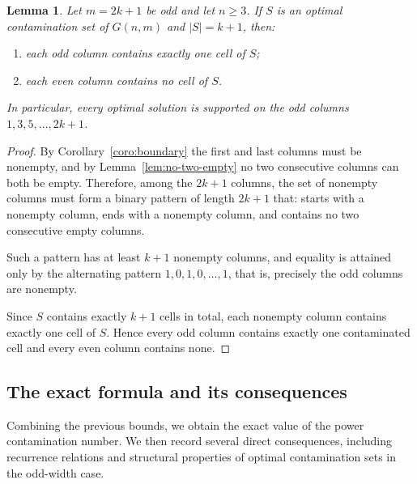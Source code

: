 \documentclass[letterpaper,12pt]{article}
\newtheorem{lemma}{Lemma}
\begin{document}
\begin{lemma}\label{lem:canonical-odd-columns}
Let $m=2k+1$ be odd and let $n\ge 3$. If $S$ is an optimal contamination set of $G(n,m)$ and $|S|=k+1$, then:
\begin{enumerate}
    \item each odd column contains exactly one cell of $S$;
    \item each even column contains no cell of $S$.
\end{enumerate}
In particular, every optimal solution is supported on the odd columns
$1,3,5,\dots,2k+1$.
\end{lemma}

\begin{proof}
By Corollary~\ref{coro:boundary} the first and last columns must be nonempty, and by Lemma~\ref{lem:no-two-empty} no two consecutive columns can both be empty. Therefore, among the $2k+1$ columns, the set of nonempty columns must form a binary pattern of length $2k+1$ that: starts with a nonempty column, ends with a nonempty column, and contains no two consecutive empty columns.


Such a pattern has at least $k+1$ nonempty columns, and equality is attained only by the alternating pattern
$1,0,1,0,\dots,1$, 
that is, precisely the odd columns are nonempty.

Since $S$ contains exactly $k+1$ cells in total, each nonempty column contains exactly one cell of $S$. Hence every odd column contains exactly one contaminated cell and every even column contains none.\qedhere
\end{proof}







    














\subsection{The exact formula and its consequences}
Combining the previous bounds, we obtain the exact value of the power contamination number. We then record several direct consequences, including recurrence relations and structural properties of optimal contamination sets in the odd-width case.
\end{document}
